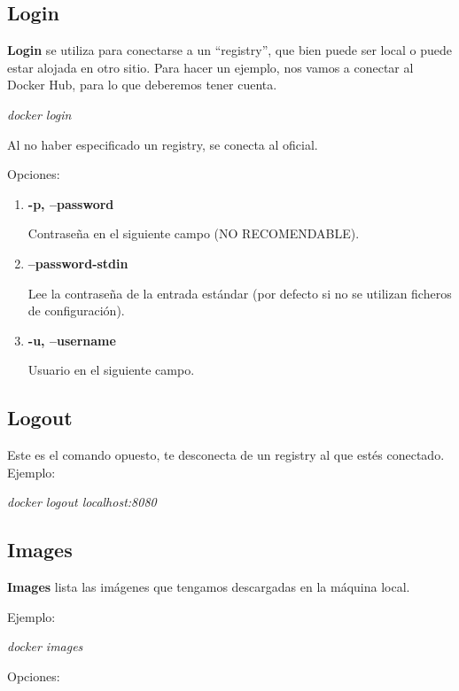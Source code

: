 \documentclass[]{article}
\begin{document}
\subsection{Login}
\textbf{Login} se utiliza para conectarse a un ``registry'', que bien puede ser local o puede estar alojada en otro sitio.
Para hacer un ejemplo, nos vamos a conectar al Docker Hub, para lo que deberemos tener cuenta.
\begin{center}
	\it
	docker login
\end{center}
Al no haber especificado un registry, se conecta al oficial.

Opciones:

\begin{enumerate}
\renewcommand{\labelenumi}{$\bullet$}
\item {\bf -p, --password}

Contraseña en el siguiente campo (NO RECOMENDABLE).
\item {\bf --password-stdin}

Lee la contraseña de la entrada estándar (por defecto si no se utilizan ficheros de configuración).
\item {\bf -u, --username}

Usuario en el siguiente campo.

\end{enumerate}


\subsection{Logout}
Este es el comando opuesto, te desconecta de un registry al que estés conectado.
Ejemplo:
\begin{center}
	\it
	docker logout localhost:8080
\end{center}

\subsection{Images}
\textbf{Images} lista las imágenes que tengamos descargadas en la máquina local.

Ejemplo:

\begin{center}
	\it
	docker images
\end{center}

Opciones:
\end{document}
